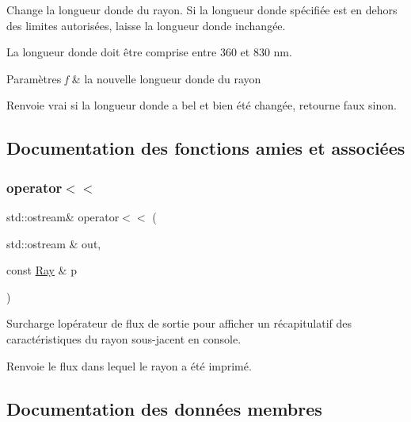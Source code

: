 Change la longueur d\textquotesingle{}onde du rayon. Si la longueur d\textquotesingle{}onde spécifiée est en dehors des limites autorisées, laisse la longueur d\textquotesingle{}onde inchangée. 

La longueur d\textquotesingle{}onde doit être comprise entre 360 et 830 nm. 
\begin{DoxyParams}{Paramètres}
{\em f} & la nouvelle longueur d\textquotesingle{}onde du rayon \\
\hline
\end{DoxyParams}
\begin{DoxyReturn}{Renvoie}
vrai si la longueur d\textquotesingle{}onde a bel et bien été changée, retourne faux sinon. 
\end{DoxyReturn}


\subsection{Documentation des fonctions amies et associées}
\mbox{\label{class_ray_a922c5f63f21a8ebd85b8544a8e1d3933}} 
\subsubsection{\texorpdfstring{operator$<$$<$}{operator<<}}
{\footnotesize\ttfamily std\+::ostream\& operator$<$$<$ (\begin{DoxyParamCaption}\item[{std\+::ostream \&}]{out,  }\item[{const \mbox{\hyperlink{class_ray}{Ray}} \&}]{p }\end{DoxyParamCaption})\hspace{0.3cm}{\ttfamily [friend]}}

Surcharge l\textquotesingle{}opérateur de flux de sortie pour afficher un récapitulatif des caractéristiques du rayon sous-\/jacent en console. \begin{DoxyReturn}{Renvoie}
le flux dans lequel le rayon a été imprimé. 
\end{DoxyReturn}


\subsection{Documentation des données membres}
\mbox{\label{class_ray_af4176c69ef62ea83bf84b40d7e1c5560}} 
